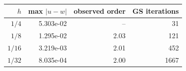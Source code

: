 \begin{tabular}{r r r r}\hline
$h$ & max $|u - w|$ & observed order & GS iterations \\
\hline
$1/4$ & 5.303e-02 & -- & 31 \\
$1/8$ & 1.295e-02 & 2.03 & 121 \\
$1/16$ & 3.219e-03 & 2.01 & 452 \\
$1/32$ & 8.035e-04 & 2.00 & 1667 \\
\hline
\end{tabular}
